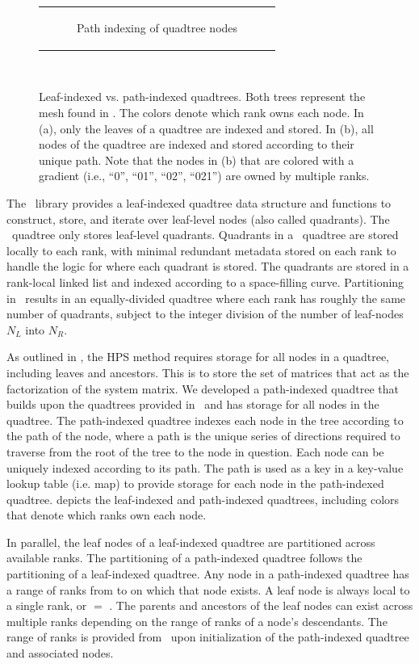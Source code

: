 \begin{figure}
\begin{tabular}{c}
\begin{subfigure}[t]{0.8\textwidth}
            \caption{Path indexing of quadtree nodes}
            \label{subfig:path-indexed-quadtree}
        \end{subfigure}
    \end{tabular}\\
    \caption{Leaf-indexed vs. path-indexed quadtrees. Both trees represent the mesh found in . The colors denote which rank owns each node. In (a), only the leaves of a quadtree are indexed and stored. In (b), all nodes of the quadtree are indexed and stored according to their unique path. Note that the nodes in (b) that are colored with a gradient (i.e., ``0'', ``01'', ``02'', ``021'') are owned by multiple ranks.}
    \label{fig:quadtree_indexing}
\end{figure}

The \pforest\ library provides a leaf-indexed quadtree data structure and functions to construct, store, and iterate over leaf-level nodes (also called quadrants). The \pforest\ quadtree only stores leaf-level quadrants. Quadrants in a \pforest\ quadtree are stored locally to each rank, with minimal redundant metadata stored on each rank to handle the logic for where each quadrant is stored. The quadrants are stored in a rank-local linked list and indexed according to a space-filling curve. Partitioning in \pforest\ results in an equally-divided quadtree where each rank has roughly the same number of quadrants, subject to the integer division of the number of leaf-nodes $N_{L}$ into $N_{R}$.

As outlined in \citep{chipman2024fast}, the HPS method requires storage for all nodes in a quadtree, including leaves and ancestors. This is to store the set of matrices that act as the factorization of the system matrix. We developed a path-indexed quadtree that builds upon the quadtrees provided in \pforest\ and has storage for all nodes in the quadtree. The path-indexed quadtree indexes each node in the tree according to the path of the node, where a path is the unique series of directions required to traverse from the root of the tree to the node in question. Each node can be uniquely indexed according to its path. The path is used as a key in a key-value lookup table (i.e. map) to provide storage for each node in the path-indexed quadtree.  depicts the leaf-indexed and path-indexed quadtrees, including colors that denote which ranks own each node.

In parallel, the leaf nodes of a leaf-indexed quadtree are partitioned across available ranks. The partitioning of a path-indexed quadtree follows the partitioning of a leaf-indexed quadtree. Any node in a path-indexed quadtree has a range of ranks from \rfirst to \rlast on which that node exists. A leaf node is always local to a single rank, or \rfirst $=$ \rlast. The parents and ancestors of the leaf nodes can exist across multiple ranks depending on the range of ranks of a node's descendants. The range of ranks is provided from \pforest\ upon initialization of the path-indexed quadtree and associated nodes.


